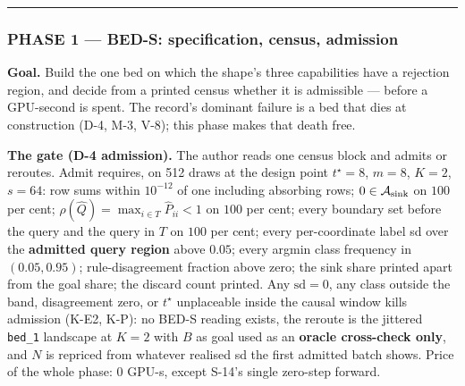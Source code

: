 \documentclass[11pt,a4paper]{article}
\theoremstyle{plain}
\theoremstyle{definition}
\theoremstyle{remark}
\begin{document}
\begin{center}\rule{0.5\linewidth}{0.5pt}\end{center}

\subsubsection{PHASE 1 --- BED-S: specification, census,
admission}\label{phase-1-bed-s-specification-census-admission}

\textbf{Goal.} Build the one bed on which the shape's three capabilities
have a rejection region, and decide from a printed census whether it is
admissible --- before a GPU-second is spent. The record's dominant
failure is a bed that dies at construction (D-4, M-3, V-8); this phase
makes that death free.

\textbf{The gate (D-4 admission).} The author reads one census block and
admits or reroutes. Admit requires, on 512 draws at the design point
\(t^\star=8\), \(m=8\), \(K=2\), \(s=64\): row sums within \(10^{-12}\)
of one including absorbing rows; \(0\in\mathcal{A}_{\rm sink}\) on
\(100\) per cent; \(\rho(\hat Q)=\max_{i\in T}\hat P_{ii}<1\) on \(100\)
per cent; every boundary set before the query and the query in \(T\) on
\(100\) per cent; every per-coordinate label sd over the
\textbf{admitted query region} above \(0.05\); every argmin class
frequency in \((0.05,0.95)\); rule-disagreement fraction above zero; the
sink share printed apart from the goal share; the discard count printed.
Any \(\mathrm{sd}=0\), any class outside the band, disagreement zero, or
\(t^\star\) unplaceable inside the causal window kills admission (K-E2,
K-P): no BED-S reading exists, the reroute is the jittered
\texttt{bed\_1} landscape at \(K=2\) with \(B\) as goal used as an
\textbf{oracle cross-check only}, and \(N\) is repriced from whatever
realised sd the first admitted batch shows. Price of the whole phase:
\(0\) GPU-s, except S-14's single zero-step forward.
\end{document}
